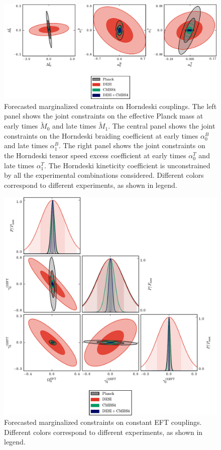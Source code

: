 \begin{figure}[!tb]
\begin{center}
\includegraphics[width=1.0\textwidth]{DarkEnergy/11_alpha_atan}
\caption{Forecasted marginalized constraints on Horndeski couplings. The left panel shows the joint constraints on the effective Planck mass at early times $\tilde{M}_0$ and late times $\tilde{M}_1$. The central panel shows the joint constraints on the Horndeski braiding coefficient at early times $\alpha^{B}_0$ and late times  $\alpha^{B}_1$. The right panel shows the joint constraints on the Horndeski tensor speed excess coefficient at early times $\alpha^{T}_0$ and late times  $\alpha^{T}_1$. The Horndeski kineticity coefficient is unconstrained by all the experimental combinations considered. Different colors correspond to different experiments, as shown in legend.}\label{fig:VariationAlpha}
\end{center}
\end{figure}

\begin{figure}[!tb]
\begin{center}
\includegraphics[width=1.0\textwidth]{DarkEnergy/6_ConstEFT}
\caption{Forecasted marginalized constraints on constant EFT couplings. Different colors correspond to different experiments, as shown in legend.}\label{fig:ConstantEFT}
\end{center}
\end{figure}

